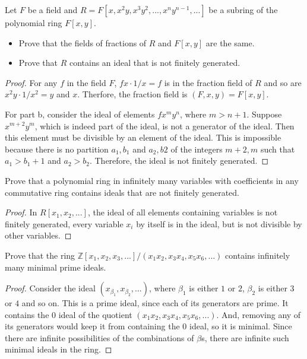 \documentclass[10pt]{article}
\newenvironment{problem}[2][Problem]{\begin{trivlist}
		\item[\hskip \labelsep {\bfseries #1}\hskip \labelsep {\bfseries #2.}]}{\end{trivlist}}
\begin{document}
	\begin{problem}{1.8}
		Let $F$ be a field and $R = F[x, x^2y, x^3y^2, ... , x^ny^{n-1},...]$ be a subring of the polynomial ring $F[x,y]$.
		\begin{itemize}
			\item[\textbf{(a)}] Prove that the fields of fractions of $R$ and $F[x,y]$ are the same.
			\item[\textbf{(b)}] Prove that $R$ contains an ideal that is not finitely generated.
		\end{itemize} 
		\begin{proof}
			For any $f$ in the field $F$, $fx \cdot 1/x = f$ is in the fraction field of $R$ and so are $x^2y \cdot 1/x^2 = y$ and $x$. Therfore, the fraction field is $(F, x, y) = F[x,y]$.
			
			For part b, consider the ideal of elements $fx^my^n$, where $m > n+1$. Suppose $x^{m+2}y^m$, which is indeed part of the ideal, is not a generator of the ideal. Then this element must be divisible by an element of the ideal. This is impossible because there is no partition $a_1,b_1$ and $a_2,b2$ of the integers $m+2, m$ such that $a_1>b_1+1$ and $a_2>b_2$. Therefore, the ideal is not finitely generated.
		\end{proof}
	\end{problem}
	
	\begin{problem}{1.9}
		Prove that a polynomial ring in infinitely many variables with coefficients in any commutative ring contains ideals that are not finitely generated.
		\begin{proof}
			In $R[x_1, x_2, ...]$, the ideal of all elements containing variables is not finitely generated, every variable $x_i$ by itself is in the ideal, but is not divisible by other variables.
		\end{proof}
	\end{problem}
	
	\begin{problem}{1.10} 
		Prove that the ring $\mathbb{Z}[x_1,x_2,x_3,...]/(x_1x_2,x_3x_4,x_5x_6,...)$ contains infinitely many minimal prime ideals. 
		
		\begin{proof}
			Consider the ideal $(x_{\beta_1}, x_{\beta_2}, ...)$, where $\beta_1$ is either $1$ or $2$, $\beta_2$ is either $3$ or $4$ and so on. This is a prime ideal, since each of its generators are prime. It contains the $0$ ideal of the quotient $(x_1x_2,x_3x_4,x_5x_6,...)$. And, removing any of its generators would keep it from containing the $0$ ideal, so it is minimal. Since there are infinite possibilities of the combinations of $\beta$s, there are infinite such minimal ideals in the ring.
		\end{proof}
	
	\end{problem}
	
\end{document}
